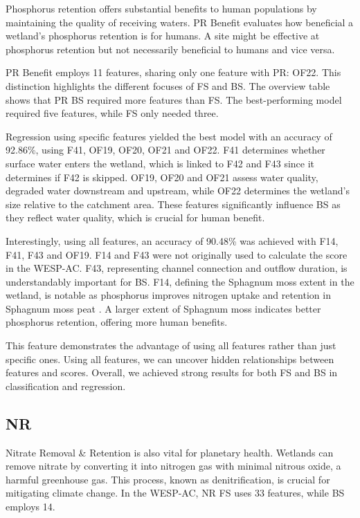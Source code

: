 \documentclass[12pt,letterpaper]{article}
\begin{document}
Phosphorus retention offers substantial benefits to human populations by maintaining the quality of receiving waters.
PR Benefit evaluates how beneficial a wetland's phosphorus retention is for humans.
A site might be effective at phosphorus retention but not necessarily beneficial to humans and vice versa.

PR Benefit employs 11 features, sharing only one feature with PR: OF22.
This distinction highlights the different focuses of \ac{FS} and \ac{BS}.
The overview table shows that \ac{PR} \ac{BS} required more features than \ac{FS}.
The best-performing model required five features, while \ac{FS} only needed three.

Regression using specific features yielded the best model with an accuracy of 92.86\%, using F41, OF19, OF20, OF21 and OF22.
F41 determines whether surface water enters the wetland, which is linked to F42 and F43 since it determines if F42 is skipped.
OF19, OF20 and OF21 assess water quality, degraded water downstream and upstream, while OF22 determines the wetland's size relative to the catchment area.
These features significantly influence \ac{BS} as they reflect water quality, which is crucial for human benefit.

Interestingly, using all features, an accuracy of 90.48\% was achieved with F14, F41, F43 and OF19.
F14 and F43 were not originally used to calculate the score in the \ac{WESP-AC}.
F43, representing channel connection and outflow duration, is understandably important for \ac{BS}.
F14, defining the Sphagnum moss extent in the wetland, is notable as phosphorus improves nitrogen uptake and retention in Sphagnum moss peat \cite{williams1999nitrogen}.
A larger extent of Sphagnum moss indicates better phosphorus retention, offering more human benefits.

This feature demonstrates the advantage of using all features rather than just specific ones.
Using all features, we can uncover hidden relationships between features and scores.
Overall, we achieved strong results for both \ac{FS} and \ac{BS} in classification and regression.

\subsection{NR}
Nitrate Removal \& Retention is also vital for planetary health.
Wetlands can remove nitrate by converting it into nitrogen gas with minimal nitrous oxide, a harmful greenhouse gas.
This process, known as denitrification, is crucial for mitigating climate change.
In the \ac{WESP-AC}, \ac{NR} \ac{FS} uses 33 features, while \ac{BS} employs 14.
\end{document}
